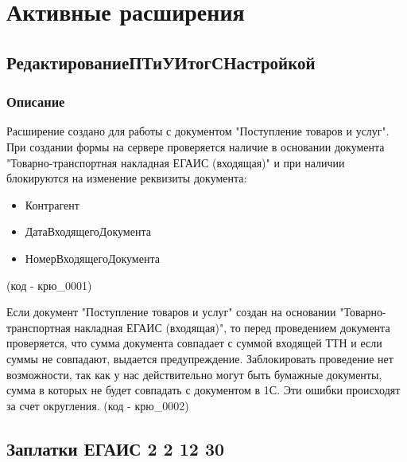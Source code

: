\section{Активные расширения}

\subsection{РедактированиеПТиУИтогСНастройкой}\label{500}
\subsubsection{Описание}
Расширение создано для работы с документом "Поступление товаров и услуг". При создании формы на сервере проверяется наличие в основании документа "Товарно-транспортная накладная ЕГАИС (входящая)" и при наличии блокируются на изменение реквизиты документа:
\begin{itemize}[label={--}]	
	\item Контрагент
	\item ДатаВходящегоДокумента
	\item НомерВходящегоДокумента	
\end{itemize}
(код - крю\_0001)\par
Если документ  "Поступление товаров и услуг" создан на основании "Товарно-транспортная накладная ЕГАИС (входящая)", то перед проведением документа проверяется, что сумма документа совпадает с суммой входящей ТТН и если суммы не совпадают, выдается предупреждение. Заблокировать проведение нет возможности, так как у нас действительно могут быть бумажные документы, сумма в которых не будет совпадать с документом в 1С. Эти ошибки происходят за счет округления.
(код - крю\_0002)\par

\subsection{Заплатки ЕГАИС 2 2 12 30}\label{501}
